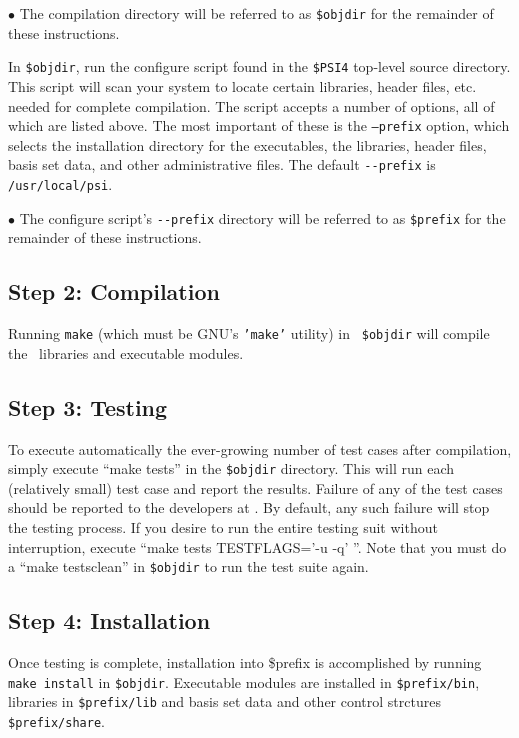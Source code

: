 \documentclass[12pt]{article}
\begin{document}
$\bullet$ The compilation directory will be referred to as {\tt \$objdir}
for the remainder of these instructions.

In {\tt \$objdir}, run the configure script found in the {\tt \$PSI4}
top-level source directory.  This script will scan your system to locate
certain libraries, header files, etc. needed for complete compilation.
The script accepts a number of options, all of which are listed above.
The most important of these is the {\tt --prefix} option, which selects the
installation directory for the executables, the libraries, header files,
basis set data, and other administrative files.  The default {\tt -}{\tt -prefix}
is {\tt /usr/local/psi}.

$\bullet$ The configure script's {\tt -}{\tt -prefix} directory will be referred
to as {\tt \$prefix} for the remainder of these instructions.

\subsection{Step 2: Compilation}

Running {\tt make} (which must be GNU's {\tt 'make'} utility) in {\tt
\$objdir} will compile the \PSIfour\ libraries and executable
modules.

\subsection{Step 3: Testing}

To execute automatically the ever-growing number of test cases after
compilation, simply execute ``make tests'' in the {\tt \$objdir}
directory.  This will run each (relatively small) test case and report
the results.  Failure of any of the test cases should be reported to
the developers at \PSIemail. By default, any such failure will stop
the testing process.  If you desire to run the entire testing suit
without interruption, execute ``make tests TESTFLAGS='-u -q' ''. Note
that you must do a ``make testsclean'' in {\tt \$objdir} to run the test
suite again.

\subsection{Step 4: Installation}

Once testing is complete, installation into \$prefix is accomplished by
running {\tt make install} in {\tt \$objdir}.   Executable modules are
installed in {\tt \$prefix/bin}, libraries in {\tt \$prefix/lib} and basis 
set data and other control strctures {\tt \$prefix/share}.
\end{document}
